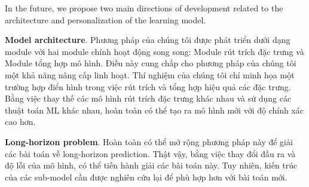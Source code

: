 \documentclass[aps,prb,groupedaddress,twocolumn,showpacs,dvipdfmx,superscriptaddress,pdftex]{revtex4-2}
\begin{document}
\vspace{2mm}


In the future, we propose two main directions of development related to the architecture and personalization of the learning model.

\vspace{2mm}

\textbf{Model architecture}. Phương pháp của chúng tôi được phát triển dưới dạng module với hai module chính hoạt động song song: Module rút trích đặc trưng và Module tổng hợp mô hình. Điều này cung chấp cho phương pháp của chúng tôi một khả năng nâng cấp linh hoạt. Thí nghiệm của chúng tôi chỉ minh họa một trường hợp điển hình trong việc rút trích và tổng hợp hiệu quả các đặc trưng. Bằng việc thay thế các mô hình rút trích đặc trưng khác nhau và sử dụng các thuật toán ML khác nhau, hoàn toàn có thể tạo ra mô hình mới với độ chính xác cao hơn.


\vspace{2mm}

\textbf{Long-horizon problem}. Hoàn toàn có thể mở rộng phương pháp này để giải các bài toán về long-horizon prediction. Thật vậy, bằng việc thay đổi đầu ra và độ lỗi của mô hình, có thể tiến hành giải các bài toán này. Tuy nhiên, kiến trúc của các sub-model cần được nghiên cứu lại để phù hợp hơn với bài toán mới.

\vspace{2mm}

\end{document}
